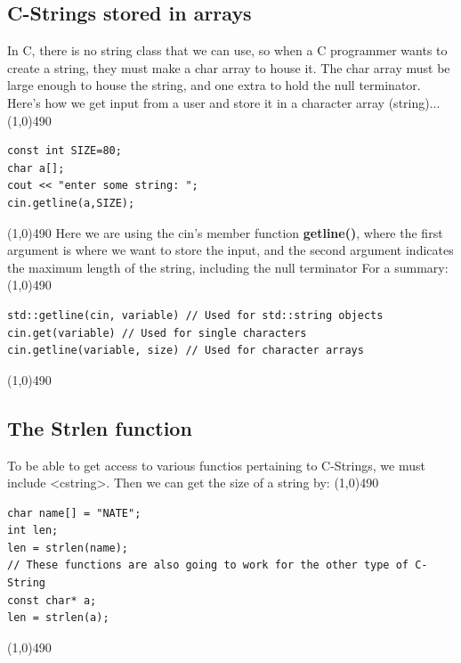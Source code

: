 \documentclass{report}
\begin{document}
    \pagebreak \bigbreak \noindent 
    \subsection{C-Strings stored in arrays}
    \bigbreak \noindent 
    In C, there is no string class that we can use, so when a C programmer wants to create a string, they must make a char array to house it. The char array must be large enough to house the string, and one extra to hold the null terminator.
    \bigbreak \noindent 
    Here's how we get input from a user and store it in a character array (string)...
    \bigbreak \noindent 
    \line(1,0){490}
    \begin{verbatim}
const int SIZE=80;
char a[];
cout << "enter some string: ";
cin.getline(a,SIZE);
    \end{verbatim}
    \line(1,0){490}
    \bigbreak \noindent 
    Here we are using the cin's member function \textbf{getline()}, where the first argument is where we want to store the input, and the second argument indicates the maximum length of the string, including the null terminator
    \bigbreak \noindent 
    For a summary:
    \bigbreak \noindent 
    \line(1,0){490}
    \begin{verbatim}
std::getline(cin, variable) // Used for std::string objects
cin.get(variable) // Used for single characters
cin.getline(variable, size) // Used for character arrays
    \end{verbatim}
    \line(1,0){490}
    \bigbreak \noindent 

    \bigbreak \noindent 
    \subsection{The Strlen function}
    \bigbreak \noindent 
    To be able to get access to various functios pertaining to C-Strings, we must include <cstring>. Then we can get the size of a string by:
    \bigbreak \noindent 
    \line(1,0){490}
    \begin{verbatim}
char name[] = "NATE";
int len;
len = strlen(name);
// These functions are also going to work for the other type of C-String
const char* a;
len = strlen(a);
    \end{verbatim}
    \line(1,0){490}
    \bigbreak \noindent 
\end{document}
